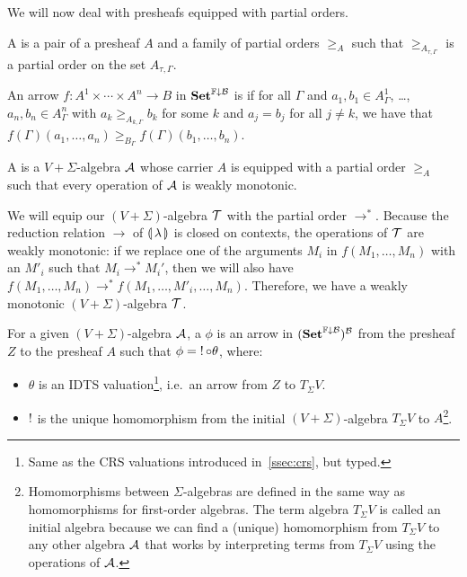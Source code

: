 We will now deal with presheafs equipped with partial orders.

\begin{definition}
  A  is a pair of a presheaf
  $A$ and a family of partial orders $\ge_A$ such that
  $\ge_{A_{\tau,\Gamma}}$ is a partial order on the set $A_{\tau,\Gamma}$.
\end{definition}

\begin{definition}
  An arrow $f : A^1 \times \cdots \times A^n \to B$ in $\mathbf{Set}^{\mathbb{F}\downarrow\mathcal{B}}$ is
   if for all $\Gamma$ and
  $a_1, b_1 \in A^1_\Gamma$, \ldots, $a_n, b_n \in A^n_\Gamma$ with
  $a_k \ge_{A_{k,\Gamma}} b_k$ for some $k$ and $a_j = b_j$ for all
  $j \neq k$, we have that
  $f(\Gamma)(a_1, \ldots, a_n) \ge_{B_\Gamma} f(\Gamma)(b_1, \ldots,
  b_n)$.
\end{definition}

\begin{definition}
  A  is a $V+\Sigma$-algebra
  $\mathcal{A}$ whose carrier $A$ is equipped with a partial order $\ge_A$ such
  that every operation of $\mathcal{A}$ is weakly monotonic.
\end{definition}

We will equip our $(V+\Sigma)$-algebra $\mathcal{T}$ with the partial order
$\to^*$. Because the reduction relation $\to$ of $\llparenthesis \, \lambda \, \rrparenthesis$ is
closed on contexts, the operations of $\mathcal{T}$ are weakly monotonic: if we
replace one of the arguments $M_i$ in $f(M_1,\ldots,M_n)$ with an $M'_i$
such that $M_i \to^* M_i'$, then we will also have
$f(M_1,\ldots,M_n) \to^* f(M_1,\ldots,M'_i,\ldots,M_n)$. Therefore, we have
a weakly monotonic $(V+\Sigma)$-algebra $\mathcal{T}$.

\begin{definition}
  For a given $(V+\Sigma)$-algebra $\mathcal{A}$, a  $\phi$ is an arrow in $(\mathbf{Set}^{\mathbb{F}\downarrow\mathcal{B}})^{\mathcal{B}}$ from the
  presheaf $Z$ to the presheaf $A$ such that $\phi = \mathop{!} {\mathbin{\circ}} \theta$,
  where:

  \begin{itemize}
  \item $\theta$ is an IDTS valuation\footnote{Same as the CRS valuations
      introduced in~\ref{ssec:crs}, but typed.}, i.e.\ an arrow from $Z$ to
    $T_\Sigma V$.
  \item $\mathop{!}$ is the unique homomorphism from the initial
    $(V+\Sigma)$-algebra $T_\Sigma V$ to $A$\footnote{Homomorphisms between
      $\Sigma$-algebras are defined in the same way as homomorphisms for
      first-order algebras. The term algebra $T_\Sigma V$ is called an
      initial algebra because we can find a (unique) homomorphism from
      $T_\Sigma V$ to any other algebra $\mathcal{A}$ that works by interpreting
      terms from $T_\Sigma V$ using the operations of $\mathcal{A}$.}.
  \end{itemize}
\end{definition}

